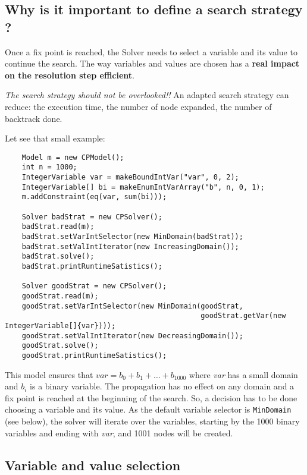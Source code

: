\subsection{Why is it important to define a search strategy ?}\label{solver:whyisitimportanttodefineasearchstrategy}\hypertarget{solver:whyisitimportanttodefineasearchstrategy}{}

Once a fix point is reached, the Solver needs to select a variable and its value to continue the search. The way variables and values are chosen has a \textbf{real impact on the resolution step efficient}. 
\begin{note}
\emph{The search strategy should not be overlooked!!}
An adapted search strategy can reduce: the execution time, the number of node expanded, the number of backtrack done.
\end{note}
Let see that small example:
\begin{lstlisting}
	Model m = new CPModel();
	int n = 1000;
	IntegerVariable var = makeBoundIntVar("var", 0, 2);
	IntegerVariable[] bi = makeEnumIntVarArray("b", n, 0, 1);
	m.addConstraint(eq(var, sum(bi)));
	
	Solver badStrat = new CPSolver();
	badStrat.read(m);
	badStrat.setVarIntSelector(new MinDomain(badStrat));
	badStrat.setValIntIterator(new IncreasingDomain());
	badStrat.solve();
	badStrat.printRuntimeSatistics();
	
	Solver goodStrat = new CPSolver();
	goodStrat.read(m);
	goodStrat.setVarIntSelector(new MinDomain(goodStrat, 
                                              goodStrat.getVar(new IntegerVariable[]{var})));
	goodStrat.setValIntIterator(new DecreasingDomain());
	goodStrat.solve();
	goodStrat.printRuntimeSatistics();
\end{lstlisting}

This model ensures that $var = b_{0} + b_{1} + \ldots + b_{1000}$ where \emph{var} has a small domain and $b_{i}$ is a binary variable. The propagation has no effect on any domain and a fix point is reached at the beginning of the search. So, a decision has to be done choosing a variable and its value. As the default variable selector is \texttt{MinDomain} (see below), the solver will iterate over the variables, starting by the 1000 binary variables and ending with \emph{var}, and 1001 nodes will be created.

\subsection{Variable and value selection}\label{solver:variableandvalueselection}\hypertarget{solver:variableandvalueselection}{}

